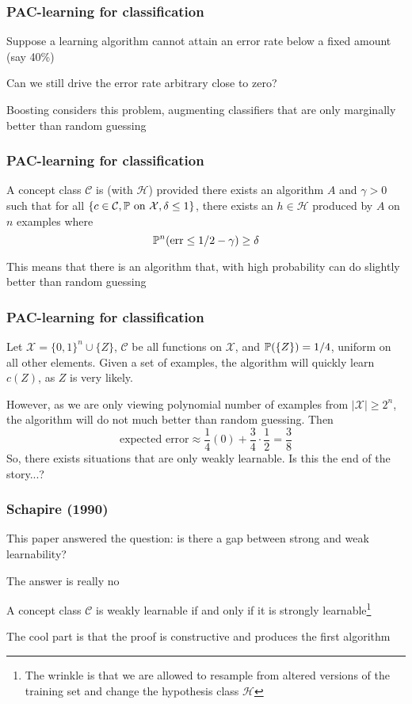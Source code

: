 \documentclass[12pt]{beamer}
\begin{document}
\begin{frame}[fragile]
\frametitle{PAC-learning for classification}
Suppose a learning algorithm cannot attain an error rate below a fixed amount (say 40\%)

\vsp
Can we still drive the error rate arbitrary close to zero?

\vsp
Boosting considers this problem, augmenting classifiers that are only marginally better 
than random guessing

\end{frame}

\begin{frame}[fragile]
\frametitle{PAC-learning for classification}
A concept class $\mathcal{C}$ is  (with $\mathcal{H}$) provided there exists an algorithm $A$
and $\gamma > 0$ such that 
for all $\{c \in \mathcal{C}, \P \textrm{ on } \mathcal{X}, \delta \leq 1\}$, there exists an $h \in \mathcal{H}$ produced
by $A$ on $n$ examples where
\[
\P^n (\textrm{err} \leq 1/2 - \gamma) \geq \delta
\]

 This means that there is an algorithm that, with high probability can do slightly better than 
random guessing
\end{frame}

\begin{frame}[fragile]
\frametitle{PAC-learning for classification}
 Let $\mathcal{X} = \{0,1\}^n \cup \{Z\}$, $\mathcal{C}$ be all functions on $\mathcal{X}$,
and $\P(\{Z\}) = 1/4$, uniform on all other elements.  Given a set of examples, the algorithm will quickly learn
$c(Z)$, as $Z$ is very likely.

\vsp
However, as we are only viewing polynomial number of examples from $|\mathcal{X}| \geq 2^n$, the algorithm
will do not much better than random guessing.  Then
\[
\textrm{expected error} \approx \frac{1}{4}(0) + \frac{3}{4}\cdot \frac{1}{2} = \frac{3}{8}
\]
\vsp
So, there exists situations that are only weakly learnable. Is this the end of the story...?
\end{frame}
\begin{frame}[fragile]
\frametitle{Schapire (1990)}
This paper answered the question: is there a gap between strong and weak learnability?

\vsp
The answer is really no

\vsp
A concept class $\mathcal{C}$ is weakly learnable if and only if it is strongly learnable\footnote{The 
wrinkle is that we are allowed to resample from altered versions of the training set and change the
hypothesis class $\mathcal{H}$}

\vsp
The cool part is that the proof is constructive and produces the first  algorithm
\end{frame}
\end{document}

